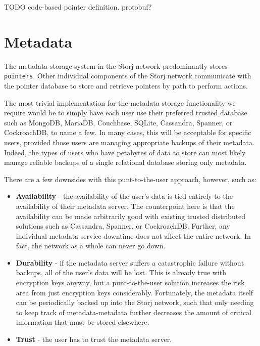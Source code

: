 \documentclass[11pt,fleqn,openany]{book}
\newcommand{\x}[1]{{\tt #1}} \newcommand{\code}[1]{{\em #1}}
\newcommand{\todo}[1]{{\color{red} TODO #1 }}
\begin{document}
\todo{code-based pointer definition. protobuf?}

\section{Metadata}\label{sec:concrete-metadata}

The metadata storage system in the Storj network predominantly stores
\x{pointers}. Other individual components of the Storj network communicate with
the pointer database to store and retrieve pointers by path to perform actions.

The most trivial implementation for the metadata storage functionality we
require would be to simply have each user use their preferred trusted database
such as MongoDB, MariaDB, Couchbase, SQLite, Cassandra\cite{cassandra},
Spanner\cite{spanner}, or CockroachDB, to name a few. In many cases, this will
be acceptable for specific users, provided those users are managing appropriate
backups of their metadata. Indeed, the types of users who have petabytes of data
to store can most likely manage reliable backups of a single relational database
storing only metadata.

There are a few downsides with this punt-to-the-user approach, however, such as:
\begin{itemize}
\item {\bf Availability} - the availability of the user's data
is tied entirely to the availability of their metadata server. The counterpoint
here is that the availability can be made arbitrarily good with existing trusted
distributed solutions such as Cassandra, Spanner, or CockroachDB. Further, any
individual metadata service downtime does not affect the entire network. In
fact, the network as a whole can never go down.
\item {\bf Durability} -
if the metadata server suffers a catastrophic failure without backups, all of
the user's data will be lost. This is already true with encryption keys anyway,
but a punt-to-the-user solution increases the risk area from just encryption
keys considerably. Fortunately, the metadata itself can be periodically backed
up into the Storj network,
such that only needing to keep track of metadata-metadata
further decreases the amount of critical information that must be stored
elsewhere.
\item {\bf Trust} - the user has to trust the metadata server.
\end{itemize}
\end{document}
